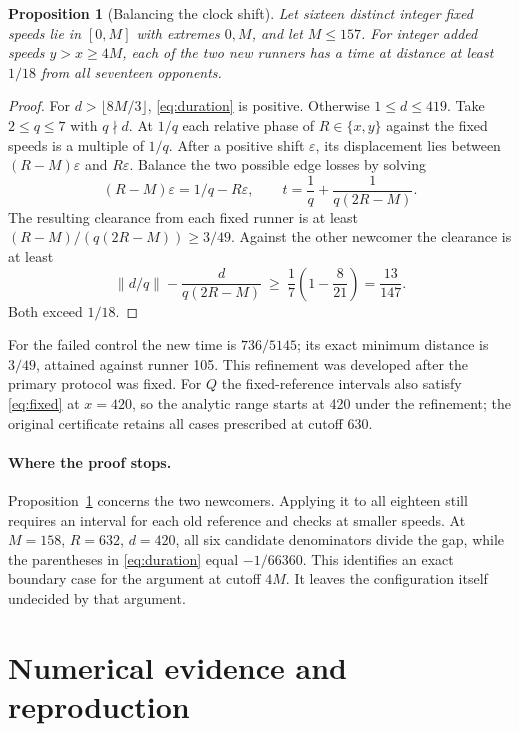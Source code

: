 \documentclass[11pt,letterpaper]{article}
\newtheorem{proposition}[lemma]{Proposition}
\newcommand{\dist}[1]{\left\lVert #1\right\rVert}
\begin{document}
\begin{proposition}[Balancing the clock shift]\label{prop:balance}
Let sixteen distinct integer fixed speeds lie in \([0,M]\) with extremes \(0,M\), and let \(M\le157\). For integer added speeds \(y>x\ge4M\), each of the two new runners has a time at distance at least \(1/18\) from all seventeen opponents.
\end{proposition}
\begin{proof}
For \(d>\lfloor 8M/3\rfloor\), \eqref{eq:duration} is positive. Otherwise \(1\le d\le419\). Take \(2\le q\le7\) with \(q\nmid d\). At \(1/q\) each relative phase of \(R\in\{x,y\}\) against the fixed speeds is a multiple of \(1/q\). After a positive shift \(\varepsilon\), its displacement lies between \((R-M)\varepsilon\) and \(R\varepsilon\). Balance the two possible edge losses by solving
\[
(R-M)\varepsilon=1/q-R\varepsilon,\qquad
t=\frac1q+\frac1{q(2R-M)}.
\]
The resulting clearance from each fixed runner is at least
\((R-M)/(q(2R-M))\ge3/49\). Against the other newcomer the clearance is at least
\[
\dist{d/q}-\frac{d}{q(2R-M)}
\ \ge\ \frac17\left(1-\frac8{21}\right)=\frac{13}{147}.
\]
Both exceed \(1/18\).
\end{proof}

For the failed control the new time is \(736/5145\); its exact minimum distance is \(3/49\), attained against runner 105. This refinement was developed after the primary protocol was fixed. For \(Q\) the fixed-reference intervals also satisfy \eqref{eq:fixed} at \(x=420\), so the analytic range starts at 420 under the refinement; the original certificate retains all cases prescribed at cutoff 630.

\paragraph{Where the proof stops.}
Proposition~\ref{prop:balance} concerns the two newcomers. Applying it to all eighteen still requires an interval for each old reference and checks at smaller speeds. At \(M=158\), \(R=632\), \(d=420\), all six candidate denominators divide the gap, while the parentheses in \eqref{eq:duration} equal \(-1/66360\). This identifies an exact boundary case for the argument at cutoff \(4M\). It leaves the configuration itself undecided by that argument.

\newpage
\section{Numerical evidence and reproduction}\label{sec:data}
\end{document}
